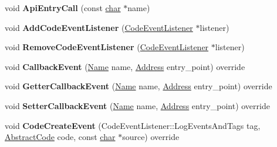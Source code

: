 \begin{DoxyCompactItemize}
\item 
\mbox{\label{classv8_1_1internal_1_1Logger_a1240868d15412e1543074364a1242dee}} 
void {\bfseries Api\+Entry\+Call} (const \mbox{\hyperlink{classchar}{char}} $\ast$name)
\item 
\mbox{\label{classv8_1_1internal_1_1Logger_ad1fc75229b3c27f9d2dfa1f808de58bd}} 
void {\bfseries Add\+Code\+Event\+Listener} (\mbox{\hyperlink{classv8_1_1internal_1_1CodeEventListener}{Code\+Event\+Listener}} $\ast$listener)
\item 
\mbox{\label{classv8_1_1internal_1_1Logger_ab68733af9c4968e0f96d82b6201d47b5}} 
void {\bfseries Remove\+Code\+Event\+Listener} (\mbox{\hyperlink{classv8_1_1internal_1_1CodeEventListener}{Code\+Event\+Listener}} $\ast$listener)
\item 
\mbox{\label{classv8_1_1internal_1_1Logger_a223050a49d1a1fcdfff9890727a5311b}} 
void {\bfseries Callback\+Event} (\mbox{\hyperlink{classv8_1_1internal_1_1Name}{Name}} name, \mbox{\hyperlink{classuintptr__t}{Address}} entry\+\_\+point) override
\item 
\mbox{\label{classv8_1_1internal_1_1Logger_a07e89e4aa95ff2a416ebcecef8ce1cf0}} 
void {\bfseries Getter\+Callback\+Event} (\mbox{\hyperlink{classv8_1_1internal_1_1Name}{Name}} name, \mbox{\hyperlink{classuintptr__t}{Address}} entry\+\_\+point) override
\item 
\mbox{\label{classv8_1_1internal_1_1Logger_affdd7edbeb3b62635023b4c4bd62cb87}} 
void {\bfseries Setter\+Callback\+Event} (\mbox{\hyperlink{classv8_1_1internal_1_1Name}{Name}} name, \mbox{\hyperlink{classuintptr__t}{Address}} entry\+\_\+point) override
\item 
\mbox{\label{classv8_1_1internal_1_1Logger_aa9da923725f0db4f2b547ff28ea8717e}} 
void {\bfseries Code\+Create\+Event} (Code\+Event\+Listener\+::\+Log\+Events\+And\+Tags tag, \mbox{\hyperlink{classv8_1_1internal_1_1AbstractCode}{Abstract\+Code}} code, const \mbox{\hyperlink{classchar}{char}} $\ast$source) override
\item 
\mbox{\label{classv8_1_1internal_1_1Logger_a272de6ad22ccc913baaff1deab33ca47}} 

\end{DoxyCompactItemize}
